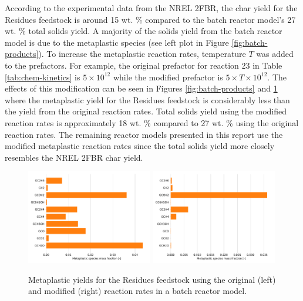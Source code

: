 According to the experimental data from the NREL 2FBR, the char yield for the Residues feedstock is around 15 wt. \% compared to the batch reactor model's 27 wt. \% total solids yield. A majority of the solids yield from the batch reactor model is due to the metaplastic species (see left plot in Figure \ref{fig:batch-products}). To increase the metaplastic reaction rates, temperature $T$ was added to the prefactors. For example, the original prefactor for reaction 23 in Table \ref{tab:chem-kinetics} is $5 \times 10^{12}$ while the modified prefactor is $5 \times T \times 10^{12}$. The effects of this modification can be seen in Figures \ref{fig:batch-products} and \ref{fig:metaplastic} where the metaplastic yield for the Residues feedstock is considerably less than the yield from the original reaction rates. Total solids yield using the modified reaction rates is approximately 18 wt. \% compared to 27 wt. \% using the original reaction rates. The remaining reactor models presented in this report use the modified metaplastic reaction rates since the total solids yield more closely resembles the NREL 2FBR char yield.

\begin{figure}[H]
    \centering
    \includegraphics[width=0.49\textwidth]{figures/metaplastic1.pdf}
    \includegraphics[width=0.49\textwidth]{figures/metaplastic2.pdf}
    \caption{Metaplastic yields for the Residues feedstock using the original (left) and modified (right) reaction rates in a batch reactor model.}
    \label{fig:metaplastic}
\end{figure}

